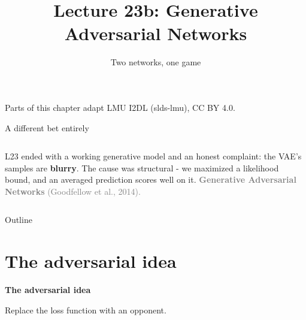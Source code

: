 \documentclass[aspectratio=169]{beamer}
\title{Lecture 23b: Generative Adversarial Networks}
\subtitle{Two networks, one game}
\date{}
\begin{document}
\begin{frame}
  \titlepage
  \begin{center}\scriptsize\color{gray}
    Parts of this chapter adapt LMU I2DL (slds-lmu), CC BY 4.0.
  \end{center}
\end{frame}

\begin{frame}{A different bet entirely}
  \small
  \begin{columns}[T]
    L23 ended with a working generative model and an honest complaint: the VAE's samples
    are \textbf{blurry}. The cause was structural - we maximized a likelihood bound, and
    an averaged prediction scores well on it.
    \vskip 5pt
    \vskip 5pt
    \footnotesize
    \textcolor{gray}{\textbf{Generative Adversarial Networks} (Goodfellow et al., 2014).}
  \end{columns}
\end{frame}

\begin{frame}{Outline}
  \tableofcontents
\end{frame}

\section{The adversarial idea}

\begin{frame}[plain]
  \vfill
  \begin{center}
    {\Large\color{popblue}\textbf{The adversarial idea}}\\[0.9em]
    \begin{minipage}{0.82\textwidth}\centering\small
      Replace the loss function with an opponent.
    \end{minipage}
  \end{center}
  \vfill
\end{frame}
\end{document}
